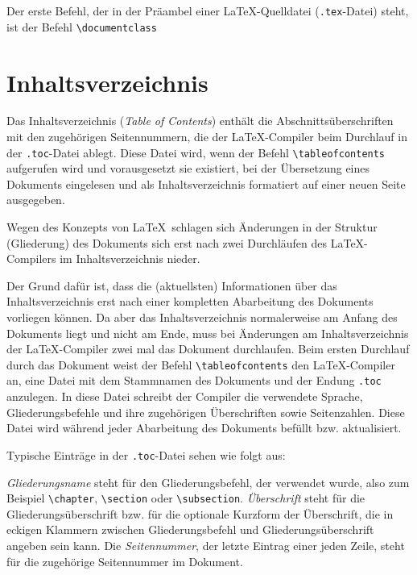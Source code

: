 Der erste Befehl, der in der Präambel einer \LaTeX-Quelldatei (\verb!.tex!-Datei) steht, ist der Befehl \verb!\documentclass!
\begin{document}
\section{Inhaltsverzeichnis}

Das Inhaltsverzeichnis (\textsl{Table of Contents}) enthält die
Abschnittsüberschriften mit den zugehörigen Seitennummern, die der \LaTeX-Compiler beim Durchlauf in der 
\verb!.toc!-Datei ablegt. Diese Datei wird, wenn der 
Befehl \verb!\tableofcontents!  
aufgerufen wird und vorausgesetzt sie existiert, bei der Übersetzung eines
Dokuments eingelesen und als Inhaltsverzeichnis formatiert 
auf einer neuen Seite ausgegeben. 


Wegen des Konzepts von \LaTeX\ schlagen sich Änderungen in der Struktur
(Gliederung) des Dokuments sich erst nach zwei Durchläufen des \LaTeX-Compilers im
Inhaltsverzeichnis nieder.

Der Grund dafür ist, dass die (aktuellsten) Informationen über das Inhaltsverzeichnis erst nach einer
kompletten Abarbeitung des Dokuments vorliegen können. Da aber das
Inhaltsverzeichnis normalerweise am Anfang des Dokuments liegt und nicht am
Ende, muss bei Änderungen am Inhaltsverzeichnis der \LaTeX-Compiler zwei mal das Dokument durchlaufen. 
Beim ersten Durchlauf durch das Dokument weist der
Befehl \verb!\tableofcontents! den \LaTeX-Compiler an, eine Datei mit dem Stammnamen des Dokuments
und der Endung \verb!.toc! anzulegen. In diese Datei schreibt der Compiler die
verwendete Sprache, Gliederungsbefehle und ihre zugehörigen Überschriften
sowie Seitenzahlen. Diese Datei wird während jeder Abarbeitung des Dokuments befüllt
bzw. aktualisiert. 

Typische Einträge in der \verb!.toc!-Datei sehen wie folgt aus:


\textsl{Gliederungsname} steht für den Gliederungsbefehl, der
verwendet wurde, also zum Beispiel \texttt{\textbackslash chapter}, \texttt{\textbackslash section} oder \texttt{\textbackslash subsection}.
\textsl{Überschrift} steht für die Gliederungsüberschrift
bzw. für die optionale Kurzform der Überschrift, die in eckigen Klammern
zwischen Gliederungsbefehl und Gliederungsüberschrift angeben sein kann. 
Die \textsl{Seitennummer}, der letzte Eintrag einer jeden Zeile, steht
für die zugehörige Seitennummer im Dokument.
\end{document}
